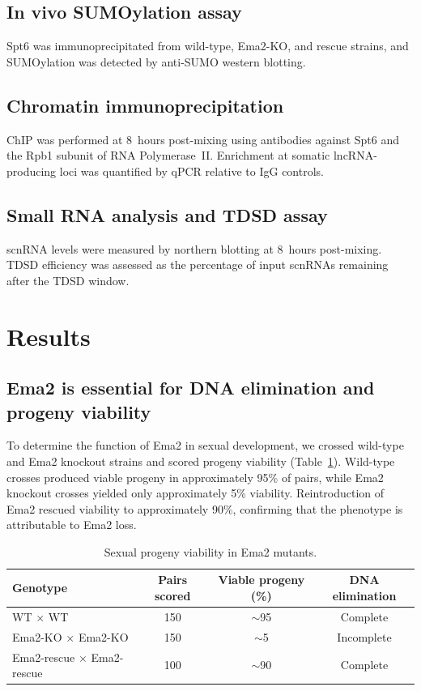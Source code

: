 \documentclass[11pt]{article}
\begin{document}
\subsection{In vivo SUMOylation assay}

Spt6 was immunoprecipitated from wild-type, Ema2-KO, and rescue strains, and SUMOylation was detected by anti-SUMO western blotting.

\subsection{Chromatin immunoprecipitation}

ChIP was performed at 8~hours post-mixing using antibodies against Spt6 and the Rpb1 subunit of RNA Polymerase~II. Enrichment at somatic lncRNA-producing loci was quantified by qPCR relative to IgG controls.

\subsection{Small RNA analysis and TDSD assay}

scnRNA levels were measured by northern blotting at 8~hours post-mixing. TDSD efficiency was assessed as the percentage of input scnRNAs remaining after the TDSD window.

\section{Results}

\subsection{Ema2 is essential for DNA elimination and progeny viability}

To determine the function of Ema2 in sexual development, we crossed wild-type and Ema2 knockout strains and scored progeny viability (Table~\ref{tab:viability}). Wild-type crosses produced viable progeny in approximately 95\% of pairs, while Ema2 knockout crosses yielded only approximately 5\% viability. Reintroduction of Ema2 rescued viability to approximately 90\%, confirming that the phenotype is attributable to Ema2 loss.

\begin{table}[ht]
\centering
\caption{Sexual progeny viability in Ema2 mutants.}
\label{tab:viability}
\begin{tabular}{lccc}
\toprule
\textbf{Genotype} & \textbf{Pairs scored} & \textbf{Viable progeny (\%)} & \textbf{DNA elimination} \\
\midrule
WT $\times$ WT & 150 & $\sim$95 & Complete \\
Ema2-KO $\times$ Ema2-KO & 150 & $\sim$5 & Incomplete \\
Ema2-rescue $\times$ Ema2-rescue & 100 & $\sim$90 & Complete \\
\bottomrule
\end{tabular}
\end{table}
\end{document}
